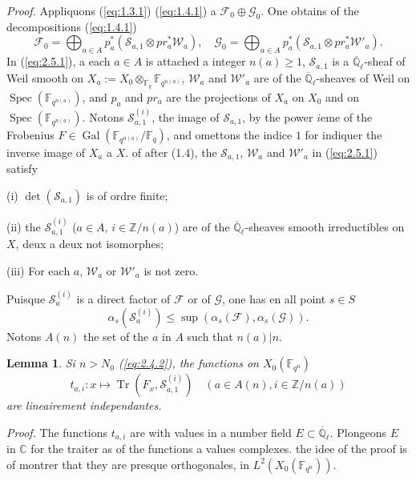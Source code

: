 \documentclass[11pt,a4paper]{article}
\theoremstyle{plain}
\newtheorem{lemma}[theorem]{Lemma}
\theoremstyle{definition}
\DeclareMathOperator{\Spec}{Spec}
\DeclareMathOperator{\Gal}{Gal}
\DeclareMathOperator{\tr}{Tr}
\begin{document}
\noindent\textit{Proof.} Appliquons (\ref{eq:1.3.1}) (\ref{eq:1.4.1}) a $\mathcal{F}_0 \oplus \mathcal{G}_0$. One obtains of the decompositions (\ref{eq:1.4.1})
\begin{equation}\label{eq:2.5.1}
\mathcal{F}_0 = \bigoplus_{a \in A} p_a^*(\mathcal{S}_{a,1} \otimes pr_a^* \mathcal{W}_a), \quad \mathcal{G}_0 = \bigoplus_{a \in A} p_a^*(\mathcal{S}_{a,1} \otimes pr_a^* \mathcal{W}'_a).
\end{equation}
In (\ref{eq:2.5.1}), a each $a \in A$ is attached a integer $n(a) \geq 1$, $\mathcal{S}_{a,1}$ is a $\overline{\mathbb{Q}}_\ell$-sheaf of Weil smooth on $X_a := X_0 \otimes_{\mathbb{F}_q} \mathbb{F}_{q^{n(a)}}$, $\mathcal{W}_a$ and $\mathcal{W}'_a$ are of the $\overline{\mathbb{Q}}_\ell$-sheaves of Weil on $\Spec(\mathbb{F}_{q^{n(a)}})$, and $p_a$ and $pr_a$ are the projections of $X_a$ on $X_0$ and on $\Spec(\mathbb{F}_{q^{n(a)}})$. Notons $\mathcal{S}_{a,1}^{(i)}$, the image of $\mathcal{S}_{a,1}$, by the power $i$eme of the Frobenius $F \in \Gal(\mathbb{F}_{q^{n(a)}}/\mathbb{F}_q)$, and omettons the indice $1$ for indiquer the inverse image of $X_a$ a $X$. of after (1.4), the $\mathcal{S}_{a,1}$, $\mathcal{W}_a$ and $\mathcal{W}'_a$ in (\ref{eq:2.5.1}) satisfy

(i) $\det(\mathcal{S}_{a,1})$ is of ordre finite;

(ii) the $\mathcal{S}_{a,1}^{(i)}$ ($a \in A$, $i \in \mathbb{Z}/n(a)$) are of the $\overline{\mathbb{Q}}_\ell$-sheaves smooth irreductibles on $X$, deux a deux not isomorphes;

(iii) For each $a$, $\mathcal{W}_a$ or $\mathcal{W}'_a$ is not zero.

Puisque $\mathcal{S}_a^{(i)}$ is a direct factor of $\mathcal{F}$ or of $\mathcal{G}$, one has en all point $s \in S$
\[
\alpha_s(\mathcal{S}_a^{(i)}) \leq \sup(\alpha_s(\mathcal{F}), \alpha_s(\mathcal{G})).
\]
Notons $A(n)$ the set of the $a$ in $A$ such that $n(a) | n$.

\begin{lemma}\label{lem:2.6}
Si $n > N_0$ (\ref{eq:2.4.2}), the functions on $X_0(\mathbb{F}_{q^n})$
\[
t_{a,i}: x \mapsto \tr(F_x, \mathcal{S}_{a,1}^{(i)}) \quad (a \in A(n), i \in \mathbb{Z}/n(a))
\]
are lineairement independantes.
\end{lemma}

\noindent\textit{Proof.} The functions $t_{a,i}$ are with values in a number field $E \subset \overline{\mathbb{Q}}_\ell$. Plongeons $E$ in $\mathbb{C}$ for the traiter as of the functions a values complexes. the idee of the proof is of montrer that they are presque orthogonales, in $L^2(X_0(\mathbb{F}_{q^n}))$.
\end{document}
